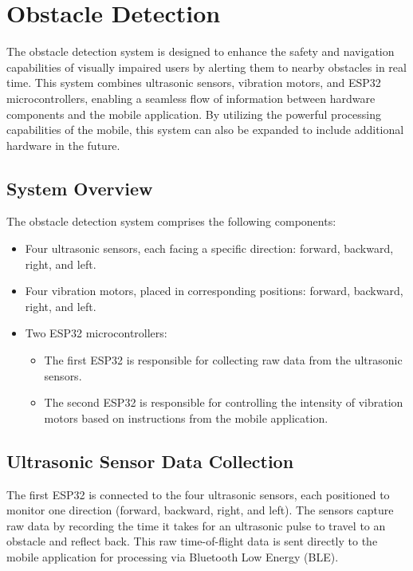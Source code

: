 \section{Obstacle Detection}

The obstacle detection system is designed to enhance the safety and navigation capabilities of visually impaired users by alerting them to nearby obstacles in real time. This system combines ultrasonic sensors, vibration motors, and ESP32 microcontrollers, enabling a seamless flow of information between hardware components and the mobile application. By utilizing the powerful processing capabilities of the mobile, this system can also be expanded to include additional hardware in the future.

\subsection{System Overview}

The obstacle detection system comprises the following components:

\begin{itemize}
	\item Four ultrasonic sensors, each facing a specific direction: forward, backward, right, and left.
	\item Four vibration motors, placed in corresponding positions: forward, backward, right, and left.
	\item Two ESP32 microcontrollers:
	\begin{itemize}
		\item The first ESP32 is responsible for collecting raw data from the ultrasonic sensors.
		\item The second ESP32 is responsible for controlling the intensity of vibration motors based on instructions from the mobile application.
	\end{itemize}
\end{itemize}

\subsection{Ultrasonic Sensor Data Collection}

The first ESP32 is connected to the four ultrasonic sensors, each positioned to monitor one direction (forward, backward, right, and left). The sensors capture raw data by recording the time it takes for an ultrasonic pulse to travel to an obstacle and reflect back. This raw time-of-flight data is sent directly to the mobile application for processing via Bluetooth Low Energy (BLE).

